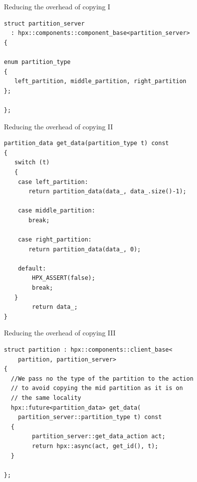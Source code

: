 \documentclass[12pt,t]{beamer}
\begin{document}
\begin{frame}[fragile]{Reducing the overhead of copying I}

\begin{center}
\end{center}


\begin{lstlisting}
struct partition_server
  : hpx::components::component_base<partition_server>
{

enum partition_type
{
   left_partition, middle_partition, right_partition
};

};
\end{lstlisting}

\end{frame}

\begin{frame}[fragile]{Reducing the overhead of copying II}

\begin{lstlisting}
partition_data get_data(partition_type t) const
{
   switch (t)
   {
    case left_partition:
       return partition_data(data_, data_.size()-1);

    case middle_partition:
       break;

    case right_partition:
       return partition_data(data_, 0);

    default:
        HPX_ASSERT(false);
        break;
   }
        return data_;
}
\end{lstlisting}

\end{frame}

\begin{frame}[fragile]{Reducing the overhead of copying III}

\begin{lstlisting}
struct partition : hpx::components::client_base<
	partition, partition_server>
{
  //We pass no the type of the partition to the action
  // to avoid copying the mid partition as it is on 
  // the same locality 
  hpx::future<partition_data> get_data(
  	partition_server::partition_type t) const
  {
        partition_server::get_data_action act;
        return hpx::async(act, get_id(), t);
  }

};
\end{lstlisting}

\end{frame}
\end{document}
